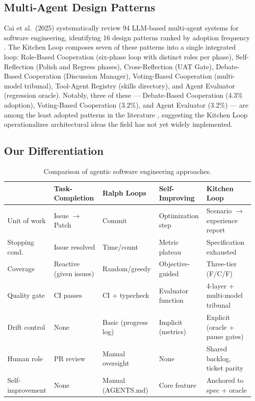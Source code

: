 \documentclass[11pt,a4paper]{article}
\begin{document}
\subsection{Multi-Agent Design Patterns}\label{sec:multi-agent-design-patterns}

Cai et al.~(2025) systematically review 94 LLM-based multi-agent systems for software engineering, identifying 16 design patterns ranked by adoption frequency \cite{cai2025}. The Kitchen Loop composes seven of these patterns into a single integrated loop: Role-Based Cooperation (six-phase loop with distinct roles per phase), Self-Reflection (Polish and Regress phases), Cross-Reflection (UAT Gate), Debate-Based Cooperation (Discussion Manager), Voting-Based Cooperation (multi-model tribunal), Tool-Agent Registry (skills directory), and Agent Evaluator (regression oracle). Notably, three of these --- Debate-Based Cooperation (4.3\% adoption), Voting-Based Cooperation (3.2\%), and Agent Evaluator (3.2\%) --- are among the least adopted patterns in the literature \cite{cai2025}, suggesting the Kitchen Loop operationalizes architectural ideas the field has not yet widely implemented.

\subsection{Our Differentiation}\label{sec:our-differentiation}

\begin{table}[ht]
\centering
\caption{Comparison of agentic software engineering approaches.}
\label{tab:differentiation}
\footnotesize
\renewcommand{\arraystretch}{1.25}
\begin{tabular}{@{}l l l l l@{}}
\toprule
& \textbf{Task-Completion} & \textbf{Ralph Loops} & \textbf{Self-Improving} & \textbf{Kitchen Loop} \\
\midrule
Unit of work       & Issue $\to$ Patch       & Commit          & Optimization step   & Scenario $\to$ experience report \\
Stopping cond.     & Issue resolved           & Time/count      & Metric plateau      & Specification exhausted \\
Coverage           & Reactive (given issues)  & Random/greedy   & Objective-guided    & Three-tier (F/C/F) \\
Quality gate       & CI passes                & CI + typecheck  & Evaluator function  & 4-layer + multi-model tribunal \\
Drift control      & None                     & Basic (progress log) & Implicit (metrics)  & Explicit (oracle + pause gates) \\
Human role         & PR review                & Manual oversight & None               & Shared backlog, ticket parity \\
Self-improvement   & None                     & Manual (AGENTS.md) & Core feature      & Anchored to spec + oracle \\
\bottomrule
\end{tabular}
\end{table}
\end{document}

